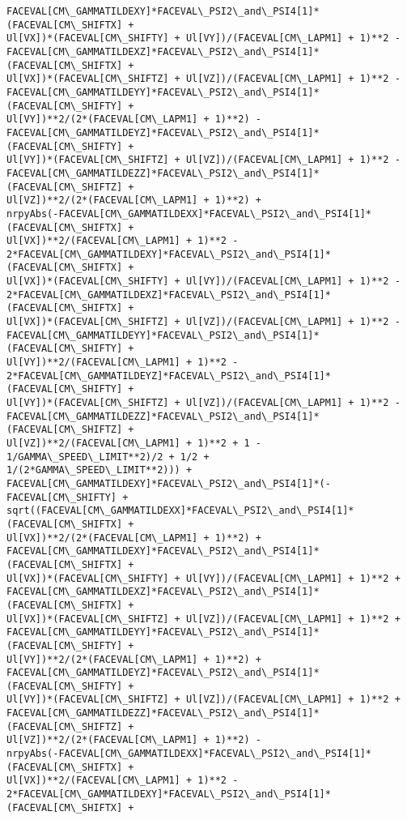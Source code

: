 \documentclass[landscape,letterpaper,10pt,english]{article}
\begin{document}
\begin{Verbatim}[commandchars=\\\{\}]
FACEVAL[CM\_GAMMATILDEXY]*FACEVAL\_PSI2\_and\_PSI4[1]*(FACEVAL[CM\_SHIFTX] +
Ul[VX])*(FACEVAL[CM\_SHIFTY] + Ul[VY])/(FACEVAL[CM\_LAPM1] + 1)**2 -
FACEVAL[CM\_GAMMATILDEXZ]*FACEVAL\_PSI2\_and\_PSI4[1]*(FACEVAL[CM\_SHIFTX] +
Ul[VX])*(FACEVAL[CM\_SHIFTZ] + Ul[VZ])/(FACEVAL[CM\_LAPM1] + 1)**2 -
FACEVAL[CM\_GAMMATILDEYY]*FACEVAL\_PSI2\_and\_PSI4[1]*(FACEVAL[CM\_SHIFTY] +
Ul[VY])**2/(2*(FACEVAL[CM\_LAPM1] + 1)**2) -
FACEVAL[CM\_GAMMATILDEYZ]*FACEVAL\_PSI2\_and\_PSI4[1]*(FACEVAL[CM\_SHIFTY] +
Ul[VY])*(FACEVAL[CM\_SHIFTZ] + Ul[VZ])/(FACEVAL[CM\_LAPM1] + 1)**2 -
FACEVAL[CM\_GAMMATILDEZZ]*FACEVAL\_PSI2\_and\_PSI4[1]*(FACEVAL[CM\_SHIFTZ] +
Ul[VZ])**2/(2*(FACEVAL[CM\_LAPM1] + 1)**2) +
nrpyAbs(-FACEVAL[CM\_GAMMATILDEXX]*FACEVAL\_PSI2\_and\_PSI4[1]*(FACEVAL[CM\_SHIFTX] +
Ul[VX])**2/(FACEVAL[CM\_LAPM1] + 1)**2 -
2*FACEVAL[CM\_GAMMATILDEXY]*FACEVAL\_PSI2\_and\_PSI4[1]*(FACEVAL[CM\_SHIFTX] +
Ul[VX])*(FACEVAL[CM\_SHIFTY] + Ul[VY])/(FACEVAL[CM\_LAPM1] + 1)**2 -
2*FACEVAL[CM\_GAMMATILDEXZ]*FACEVAL\_PSI2\_and\_PSI4[1]*(FACEVAL[CM\_SHIFTX] +
Ul[VX])*(FACEVAL[CM\_SHIFTZ] + Ul[VZ])/(FACEVAL[CM\_LAPM1] + 1)**2 -
FACEVAL[CM\_GAMMATILDEYY]*FACEVAL\_PSI2\_and\_PSI4[1]*(FACEVAL[CM\_SHIFTY] +
Ul[VY])**2/(FACEVAL[CM\_LAPM1] + 1)**2 -
2*FACEVAL[CM\_GAMMATILDEYZ]*FACEVAL\_PSI2\_and\_PSI4[1]*(FACEVAL[CM\_SHIFTY] +
Ul[VY])*(FACEVAL[CM\_SHIFTZ] + Ul[VZ])/(FACEVAL[CM\_LAPM1] + 1)**2 -
FACEVAL[CM\_GAMMATILDEZZ]*FACEVAL\_PSI2\_and\_PSI4[1]*(FACEVAL[CM\_SHIFTZ] +
Ul[VZ])**2/(FACEVAL[CM\_LAPM1] + 1)**2 + 1 - 1/GAMMA\_SPEED\_LIMIT**2)/2 + 1/2 +
1/(2*GAMMA\_SPEED\_LIMIT**2))) +
FACEVAL[CM\_GAMMATILDEXY]*FACEVAL\_PSI2\_and\_PSI4[1]*(-FACEVAL[CM\_SHIFTY] +
sqrt((FACEVAL[CM\_GAMMATILDEXX]*FACEVAL\_PSI2\_and\_PSI4[1]*(FACEVAL[CM\_SHIFTX] +
Ul[VX])**2/(2*(FACEVAL[CM\_LAPM1] + 1)**2) +
FACEVAL[CM\_GAMMATILDEXY]*FACEVAL\_PSI2\_and\_PSI4[1]*(FACEVAL[CM\_SHIFTX] +
Ul[VX])*(FACEVAL[CM\_SHIFTY] + Ul[VY])/(FACEVAL[CM\_LAPM1] + 1)**2 +
FACEVAL[CM\_GAMMATILDEXZ]*FACEVAL\_PSI2\_and\_PSI4[1]*(FACEVAL[CM\_SHIFTX] +
Ul[VX])*(FACEVAL[CM\_SHIFTZ] + Ul[VZ])/(FACEVAL[CM\_LAPM1] + 1)**2 +
FACEVAL[CM\_GAMMATILDEYY]*FACEVAL\_PSI2\_and\_PSI4[1]*(FACEVAL[CM\_SHIFTY] +
Ul[VY])**2/(2*(FACEVAL[CM\_LAPM1] + 1)**2) +
FACEVAL[CM\_GAMMATILDEYZ]*FACEVAL\_PSI2\_and\_PSI4[1]*(FACEVAL[CM\_SHIFTY] +
Ul[VY])*(FACEVAL[CM\_SHIFTZ] + Ul[VZ])/(FACEVAL[CM\_LAPM1] + 1)**2 +
FACEVAL[CM\_GAMMATILDEZZ]*FACEVAL\_PSI2\_and\_PSI4[1]*(FACEVAL[CM\_SHIFTZ] +
Ul[VZ])**2/(2*(FACEVAL[CM\_LAPM1] + 1)**2) -
nrpyAbs(-FACEVAL[CM\_GAMMATILDEXX]*FACEVAL\_PSI2\_and\_PSI4[1]*(FACEVAL[CM\_SHIFTX] +
Ul[VX])**2/(FACEVAL[CM\_LAPM1] + 1)**2 -
2*FACEVAL[CM\_GAMMATILDEXY]*FACEVAL\_PSI2\_and\_PSI4[1]*(FACEVAL[CM\_SHIFTX] +

\end{Verbatim}
\end{document}
